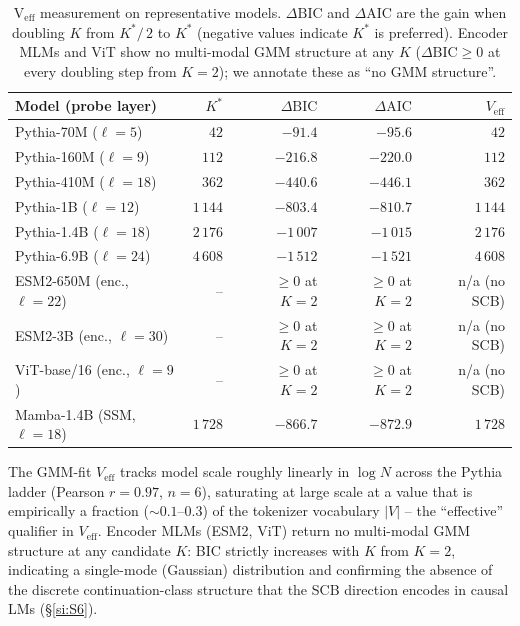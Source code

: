 \documentclass[11pt,a4paper]{article}
\begin{document}
\begin{table}[h]
\centering
\small
\caption{V$_\mathrm{eff}$ measurement on representative models.
$\Delta\mathrm{BIC}$ and $\Delta\mathrm{AIC}$ are the gain when
doubling $K$ from $K^*\!/\,2$ to $K^*$ (negative values indicate
$K^*$ is preferred). Encoder MLMs and ViT show no multi-modal
GMM structure at any $K$ ($\Delta\mathrm{BIC}\!\geq\!0$ at every
doubling step from $K\!=\!2$); we annotate these as
``no GMM structure''.}
\label{tab:S2-veff}
\begin{tabular}{lrrrr}
\toprule
Model (probe layer)             & $K^*$    & $\Delta\mathrm{BIC}$ & $\Delta\mathrm{AIC}$ & $V_\mathrm{eff}$ \\
\midrule
Pythia-70M   ($\ell\!=\!5$)      & $42$     & $-91.4$    & $-95.6$    & $42$ \\
Pythia-160M  ($\ell\!=\!9$)      & $112$    & $-216.8$   & $-220.0$   & $112$ \\
Pythia-410M  ($\ell\!=\!18$)     & $362$    & $-440.6$   & $-446.1$   & $362$ \\
Pythia-1B    ($\ell\!=\!12$)     & $1\,144$ & $-803.4$   & $-810.7$   & $1\,144$ \\
Pythia-1.4B  ($\ell\!=\!18$)     & $2\,176$ & $-1\,007$  & $-1\,015$  & $2\,176$ \\
Pythia-6.9B  ($\ell\!=\!24$)     & $4\,608$ & $-1\,512$  & $-1\,521$  & $4\,608$ \\
ESM2-650M    (enc., $\ell\!=\!22$) & --     & $\geq 0$ at $K\!=\!2$ & $\geq 0$ at $K\!=\!2$ & n/a (no SCB) \\
ESM2-3B      (enc., $\ell\!=\!30$) & --     & $\geq 0$ at $K\!=\!2$ & $\geq 0$ at $K\!=\!2$ & n/a (no SCB) \\
ViT-base/16  (enc., $\ell\!=\!9$)  & --     & $\geq 0$ at $K\!=\!2$ & $\geq 0$ at $K\!=\!2$ & n/a (no SCB) \\
Mamba-1.4B   (SSM, $\ell\!=\!18$) & $1\,728$ & $-866.7$  & $-872.9$   & $1\,728$ \\
\bottomrule
\end{tabular}
\end{table}

The GMM-fit $V_\mathrm{eff}$ tracks model scale roughly linearly in
$\log N$ across the Pythia ladder (Pearson $r\!=\!0.97$, $n\!=\!6$),
saturating at large scale at a value that is empirically a fraction
($\sim\!0.1$--$0.3$) of the tokenizer vocabulary $|V|$ -- the
``effective'' qualifier in $V_\mathrm{eff}$. Encoder MLMs (ESM2,
ViT) return no multi-modal GMM structure at any candidate $K$: BIC
strictly increases with $K$ from $K\!=\!2$, indicating a single-mode
(Gaussian) distribution and confirming the absence of the discrete
continuation-class structure that the SCB direction encodes in
causal LMs (\S\ref{si:S6}).
\end{document}

